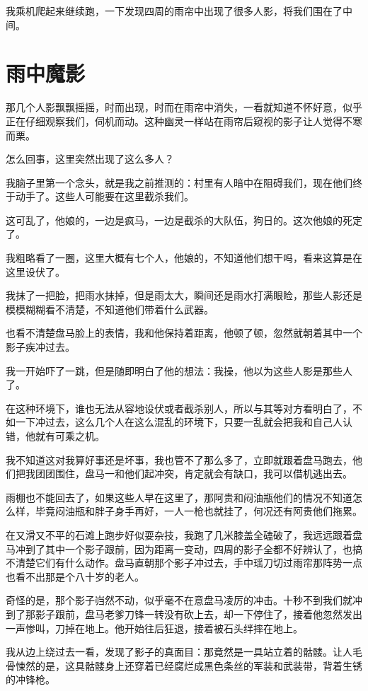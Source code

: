 我乘机爬起来继续跑，一下发现四周的雨帘中出现了很多人影，将我们围在了中间。

\chapter{雨中魔影}

那几个人影飘飘摇摇，时而出现，时而在雨帘中消失，一看就知道不怀好意，似乎正在仔细观察我们，伺机而动。这种幽灵一样站在雨帘后窥视的影子让人觉得不寒而栗。

怎么回事，这里突然出现了这么多人？

我脑子里第一个念头，就是我之前推测的：村里有人暗中在阻碍我们，现在他们终于动手了。这些人可能要在这里截杀我们。

这可乱了，他娘的，一边是疯马，一边是截杀的大队伍，狗日的。这次他娘的死定了。

我粗略看了一圈，这里大概有七个人，他娘的，不知道他们想干吗，看来这算是在这里设伏了。

我抹了一把脸，把雨水抹掉，但是雨太大，瞬间还是雨水打满眼睑，那些人影还是模模糊糊看不清楚，不知道他们带着什么武器。

也看不清楚盘马脸上的表情，我和他保持着距离，他顿了顿，忽然就朝着其中一个影子疾冲过去。

我一开始吓了一跳，但是随即明白了他的想法：我操，他以为这些人影是那些人了。

在这种环境下，谁也无法从容地设伏或者截杀别人，所以与其等对方看明白了，不如一下冲过去，这么几个人在这么混乱的环境下，只要一乱就会把我和自己人认错，他就有可乘之机。

我不知道这对我算好事还是坏事，我也管不了那么多了，立即就跟着盘马跑去，他们把我团团围住，盘马一和他们起冲突，肯定就会有缺口，我可以借机逃出去。

雨棚也不能回去了，如果这些人早在这里了，那阿贵和闷油瓶他们的情况不知道怎么样，毕竟闷油瓶和胖子身手再好，一人一枪也就挂了，何况还有阿贵他们拖累。

在又滑又不平的石滩上跑步好似耍杂技，我跑了几米膝盖全磕破了，我远远跟着盘马冲到了其中一个影子跟前，因为距离一变动，四周的影子全都不好辨认了，也搞不清楚它们有什么动作。盘马直朝那个影子冲过去，手中瑶刀切过雨帘那阵势一点也看不出那是个八十岁的老人。

奇怪的是，那个影子岿然不动，似乎毫不在意盘马凌厉的冲击。十秒不到我们就冲到了那影子跟前，盘马老爹刀锋一转没有砍上去，却一下停住了，接着他忽然发出一声惨叫，刀掉在地上。他开始往后狂退，接着被石头绊摔在地上。

我从边上绕过去一看，发现了影子的真面目：那竟然是一具站立着的骷髅。让人毛骨悚然的是，这具骷髅身上还穿着已经腐烂成黑色条丝的军装和武装带，背着生锈的冲锋枪。


